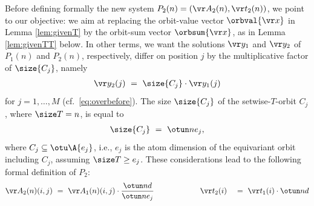 Before defining formally the new system 
$P_2(n) = ({\vr A_2}(n), {\vr t_2}(n))$,
we point to our objective: we aim at replacing the orbit-value vector $\orbval {\vr x}$ 
in Lemma \ref{lem:givenT} by the orbit-sum vector
$\orbsum {\vr x}$, as in Lemma \ref{lem:givenTT} below.
In other terms, we want the solutions $\vr y_1$ and ${\vr y_2}$ of $P_1(n)$ and
$P_2(n)$, respectively, 
%
differ on position $j$ by the multiplicative factor of $\size{C_j}$, 
namely
%
\begin{align} \label{eq:over}
{\vr y_2}(j) \ = \ \size{C_j} \cdot \vr y_1(j)
\end{align}
%
for $j = 1, \ldots, M$ (cf.~\eqref{eq:overbefore}).
The size $\size {C_j}$ of the setwise-$T$-orbit $C_j$, where $\size T = n$, is equal to
\begin{align} \label{eq:orbitsize}
\size{C_j} \ = \ \otun n {e_j},   %
\end{align}
where $C_j \subseteq \otu \A {e_j}$, i.e., 
$e_j$ is the atom dimension of the equivariant orbit including $C_j$, assuming
$\size T \geq e_j$.
These considerations lead to the following formal definition of $P_2$:
\begin{align} \label{eq:defP}
\begin{aligned}
{\vr A_2}(n)(i,j) \ & = \  \vr A_1(n)(i,j) \cdot
\frac{\otun n d}{\otun n {e_j}} 
\qquad\qquad\qquad
%
{\vr t_2}(i) \ & = \ \vr t_1(i) \cdot \otun n d  %
\end{aligned}
\end{align}
